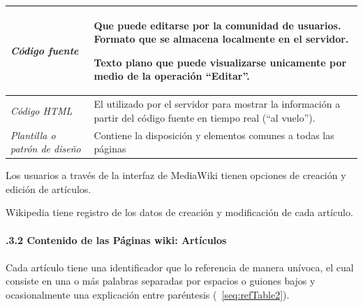 \documentclass[letterpaper]{article}
\begin{document}
\begin{center}
\label{seq:refTable1}\tablehead{}
\begin{supertabular}{|m{4.2980003cm}|m{9.087cm}|}
\hline
\centering {}\itshape C\'odigo fuente &
{ Que puede editarse por la comunidad de
usuarios. Formato que se almacena localmente en el servidor.}

 Texto plano que puede visualizarse unicamente
por medio de la operaci\'on
{\textquotedblleft}Editar{\textquotedblright}.\\\hline
\centering {}\itshape C\'odigo HTML &
 El utilizado por el servidor para mostrar la
informaci\'on a partir del c\'odigo fuente en tiempo real
({\textquotedblleft}al vuelo{\textquotedblright}).\\\hline
\centering {}\itshape Plantilla o patr\'on de
dise\~no &
 Contiene la disposici\'on y elementos comunes a
todas las p\'aginas\\\hline
\end{supertabular}
\end{center}

\bigskip

{\sffamily
Los usuarios a trav\'es de la interfaz de MediaWiki tienen opciones de
creaci\'on y edici\'on de art\'iculos.}


\bigskip

{\sffamily
Wikipedia tiene registro de los datos de creaci\'on y modificaci\'on de
cada art\'iculo.}

\paragraph[]{\sffamily }
\paragraph[2.2.3.2 Contenido de las P\'aginas wiki:
Art\'iculos]{.3.2 Contenido de las
P\'aginas wiki: Art\'iculos}
\paragraph[]{\sffamily }
{\sffamily
Cada art\'iculo tiene una identificador que lo referencia de manera
un\'ivoca, el cual consiste en una o m\'as palabras separadas por
espacios o guiones bajos y ocasionalmente una explicaci\'on entre
par\'entesis (\tablename~\ref{seq:refTable2}).}
\end{document}
